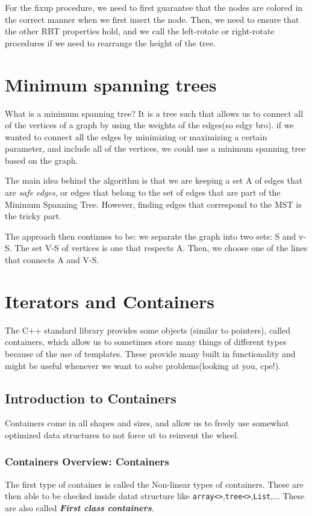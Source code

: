 \documentclass{article}
\begin{document}
For the fixup procedure, we need to first guarantee that the nodes are colored in the correct manner when we 
first insert the node. Then, we need to ensure that the other RBT properties hold, and we call the 
left-rotate or right-rotate procedures if we need to rearrange the height of the tree. 
\section{Minimum spanning trees}
What is  a minimum spanning tree? It is a tree such that allows us to connect all of the vertices of a 
graph by using the weights of the edges(so edgy bro). if we wanted to connect all the edges by minimizing 
or maximizing a certain parameter, and include all of the vertices, we could use a minimum spanning tree 
based on the graph.


The main idea behind the algorithm is that we are keeping a set A of edges that are \textit{safe edges}, 
or edges that belong to the set of edges that are part of the Minimum Spanning Tree. However, finding edges
that correspond to the MST is the tricky part.

The approach then continues to be: we separate the graph into two sets: S and v-S. The set V-S of vertices
is one that respects A. Then, we choose one of the lines that connects A and V-S. 

\section{Iterators and Containers}
The C++ standard library provides some objects (similar to pointers), called containers, which allow us to 
sometimes store many things of different types because of the use of templates. These provide many built in 
functionality and might be useful whenever we want to solve problems(looking at you, cpe!).
\subsection{Introduction to Containers}
Containers come in all shapes and sizes, and allow us to freely use somewhat optimized data structures to not force
ut to reinvent the wheel.
\subsubsection{Containers Overview: Containers}
The first type of container is called the Non-linear types of containers. These  are then able to be checked
inside datat structure like \texttt{array<>},\texttt{tree<>},\texttt{List},...
These are also called \textit{\textbf{First class containers}}.
\end{document}
